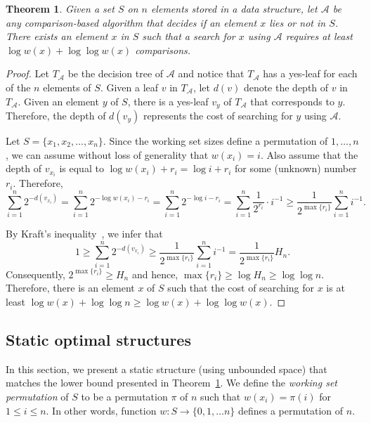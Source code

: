 \documentclass[11pt]{article}       %
\newtheorem{theorem}{Theorem}
\newcommand{\depth}[1]{\ensuremath{d(#1)}}
\begin{document}
\begin{theorem}\label{theorem:Lower bound}
Given a set $S$ on $n$ elements stored in a data structure, let $\mathcal A$ be any comparison-based algorithm that decides if an element $x$ lies or not in $S$. 
There exists an element $x$ in $S$ such that a search for $x$ using $\mathcal A$ requires at least $\log w(x) + \log\log w(x)$ comparisons.
\end{theorem}
\begin{proof}
Let $T_{\mathcal A}$ be the decision tree of $\mathcal A$ and notice that $T_{\mathcal A}$ has a yes-leaf for each of the $n$ elements of $S$. Given a leaf $v$ in $T_{\mathcal A}$, let $\depth{v}$ denote the depth of $v$ in $T_{\mathcal A}$.
Given an element $y$ of $S$, there is a yes-leaf $v_y$ of $T_{\mathcal A}$ that corresponds to $y$. Therefore, the depth of $\depth{v_y}$ represents the cost of searching for $y$ using $\mathcal A$.

Let $S = \{x_1, x_2, \ldots, x_n\}$. Since the working set sizes define a permutation of $1, \ldots, n$, we can assume without loss of generality that $w(x_i) = i$. Also assume that the depth of $v_{x_i}$ is equal to $\log w(x_i) + r_i = \log i + r_i$ for some (unknown) number $r_i$. 
Therefore, $$\sum_{i=1}^{n} 2^{-\depth{v_{x_i}}} = \sum_{i=1}^{n} 2^{-\log w(x_i) - r_i} =  \sum_{i=1}^{n} 2^{-\log i - r_i} = \sum_{i=1}^{n} \frac{1}{2^{r_i}}\cdot i^{-1}\geq \frac{1}{2^{\max\{r_i\}}} \sum_{i=1}^{n} i^{-1}.$$

By Kraft's inequality~\cite{kraftsInequality}, we infer that
$$1\geq \sum_{i=1}^{n} 2^{-\depth{v_{x_i}}} \geq \frac{1}{2^{\max\{r_i\}}} \sum_{i=1}^{n} i^{-1} = \frac{1}{2^{\max\{r_i\}}} H_n.$$
Consequently, $2^{\max\{r_i\}} \geq H_n$ and hence, $\max\{r_i\}\geq \log H_n \geq \log \log n$. Therefore, there is an element $x$ of $S$ such that the cost of searching for $x$ is at least $\log w(x) + \log\log n \geq \log w(x) + \log\log w(x)$.
\end{proof}

\subsection{Static optimal structures}
In this section, we present a static structure (using unbounded space) that matches the lower bound presented in Theorem~\ref{theorem:Lower bound}. 
We define the \emph{working set permutation} of $S$ to be a permutation $\pi$ of $n$ such that $w(x_i) = \pi(i)$ for $1\leq i \leq n$. In other words, function $w:S\to \{0, 1, \ldots n\}$ defines a permutation of $n$.
\end{document}
